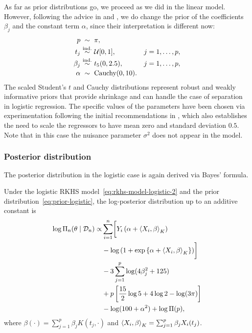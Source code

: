 As far as prior distributions go, we proceed as we did in the linear model. However, following the advice in \citet{gelman2008weakly} and \citet{ghosh2018use}, we do change the prior of the coefficients \(\beta_j\) and the constant term \(\alpha\), since their interpretation is different now:
\begin{equation}\label{eq:prior-logistic}
  \begin{array}{r@{\ }c@{\ }l@{\quad}l}
    p       & \sim               & \pi,                   &                \\[0.2em]
    t_j     & \textoversim{ind.} & \mathcal{U}[0,1],      & j = 1,\dots,p, \\[0.2em]
    \beta_j & \textoversim{ind.} & t_5(0,2.5),            & j = 1,\dots,p, \\[0.2em]
    \alpha  & \sim               & \text{Cauchy}(0,10). &
  \end{array}
  \end{equation}
The scaled Student's \(t\) and Cauchy distributions represent robust and weakly informative priors that provide shrinkage and can handle the case of separation in logistic regression. The specific values of the parameters have been chosen via experimentation following the initial recommendations in \citet{ghosh2018use}, which also establishes the need to scale the regressors to have mean zero and standard deviation \(0.5\). Note that in this case the nuisance parameter \(\sigma^2\) does not appear in the model.

\subsubsection*{Posterior distribution}

The posterior distribution in the logistic case is again derived via Bayes' formula.

\begin{proposition}
  Under the logistic \acs{RKHS} model~\eqref{eq:rkhs-model-logistic-2} and the prior distribution~\eqref{eq:prior-logistic}, the log-posterior distribution up to an additive constant is
  \begin{align*}
    \log \Pi_n(\theta \mid \mathcal D_n) \propto & \sum_{i=1}^n \biggl[Y_i \left(\alpha + \left\langle X_i,\beta\right\rangle_K\right)\\
    & - \log\left(1 + \exp\left\{\alpha +\left\langle X_i,\beta\right\rangle_K\right\}\right) \biggr]\\
    & - 3\sum_{j=1}^p \log(4\beta_j^2 + 125)\\
    & + p \left[\frac{15}{2}\log 5 + 4 \log 2 - \log (3\pi)\right]\\
    & - \log(100 + \alpha^2) + \log \Pi(p),
  \end{align*}
  where \(\beta(\cdot)=\sum_{j=1}^p \beta_j K(t_j, \cdot)\) and \(\left\langle X_i,\beta\right\rangle_K = \sum_{j=1}^p \beta_j X_i(t_j)\).
\end{proposition}

